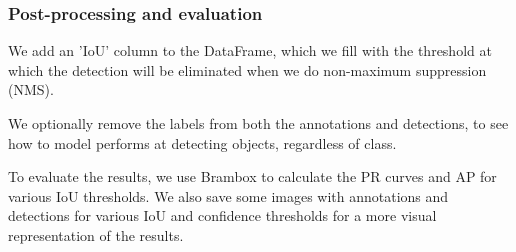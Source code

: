 \subsubsection*{Post-processing and evaluation} 

We add an 'IoU' column to the DataFrame, which we fill with the threshold at which the detection will be eliminated when we do non-maximum suppression (NMS). 

We optionally remove the labels from both the annotations and detections, to see how to model performs at detecting objects, regardless of class. 

To evaluate the results, we use Brambox to calculate the PR curves and AP for various IoU thresholds. We also save some images with annotations and detections for various IoU and confidence thresholds for a more visual representation of the results.